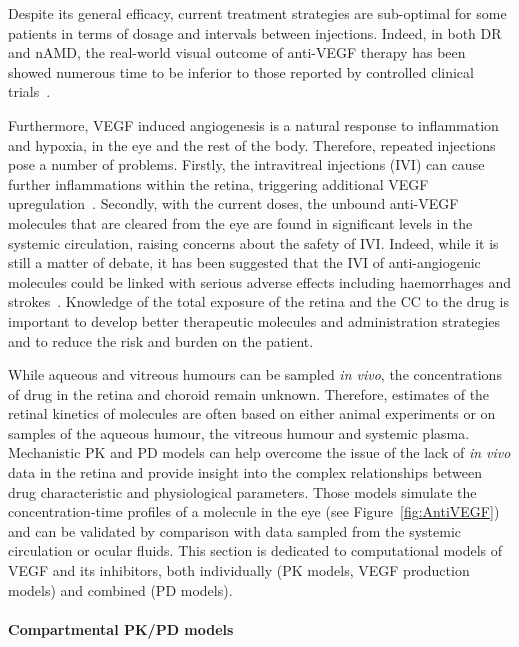 \documentclass{article}
\begin{document}
Despite its general efficacy, current treatment strategies are sub-optimal for some patients in terms of dosage and intervals between injections.
Indeed, in both DR and nAMD, the real-world visual outcome of anti-VEGF therapy has been showed numerous time to be inferior to those reported by controlled clinical trials~\cite{Ciulla_2018, Ciulla_2020, Ozturk_2017}.

Furthermore, VEGF induced angiogenesis is a natural response to inflammation and hypoxia, in the eye and the rest of the body. 
Therefore, repeated injections pose a number of problems.
Firstly, the intravitreal injections (IVI) can cause further inflammations within the retina, triggering additional VEGF upregulation~\cite{Iyer_2022}.
Secondly, with the current doses, the unbound anti-VEGF molecules that are cleared from the eye are found in significant levels in the systemic circulation, raising concerns about the safety of IVI.
Indeed, while it is still a matter of debate, it has been suggested that the IVI of anti-angiogenic molecules could be linked with serious adverse effects including haemorrhages and strokes~\cite{Avery_2016, Kaiser_2019, Maloney_2021}.
Knowledge of the total exposure of the retina and the CC to the drug is important to develop better therapeutic molecules and administration strategies and to reduce the risk and burden on the patient.

While aqueous and vitreous humours can be sampled \textit{in vivo}, the concentrations of drug in the retina and choroid remain unknown. 
Therefore, estimates of the retinal kinetics of molecules are often based on either animal experiments or on samples of the aqueous humour, the vitreous humour and systemic plasma.
Mechanistic PK and PD models can help overcome the issue of the lack of \textit{in vivo} data in the retina and provide insight into the complex relationships between drug characteristic and physiological parameters.
Those models simulate the concentration-time profiles of a molecule in the eye (see Figure~\ref{fig:AntiVEGF}) and can be validated by comparison with data sampled from the systemic circulation or ocular fluids.
This section is dedicated to computational models of VEGF and its inhibitors, both individually (PK models, VEGF production models) and combined (PD models).

\paragraph*{Compartmental PK/PD models}
\end{document}
